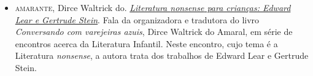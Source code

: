 \documentclass[11pt]{extarticle}
\begin{document}
\begin{itemize}

\item \textsc{amarante}, Dirce Waltrick do. \href{https://www.youtube.com/watch?v=2hhvZFCfLlg}{\textit{Literatura \emph{nonsense} para crianças: Edward Lear e
Gertrude Stein}}. 
Fala da organizadora e tradutora do livro \textit{Conversando com varejeiras azuis}, Dirce Waltrick do Amaral,
em série de encontros acerca da Literatura Infantil. Neste encontro, cujo tema é a Literatura \emph{nonsense},
a autora trata dos trabalhos de Edward Lear e Gertrude Stein.

\end{itemize}
\end{document}
